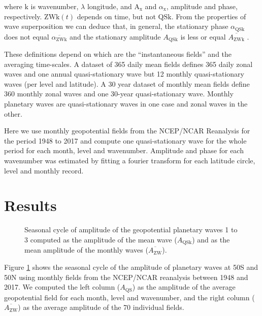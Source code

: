 \documentclass[draft,linenumbers]{agujournal2018}
\begin{document}
where \(\mathrm{k}\) is wavenumber, \(\lambda\) longitude, and
\(\mathrm{A_{x}}\) and \(\alpha_\mathrm{x}\), amplitude and phase,
respectively. \(\mathrm{ZWk}(t)\) depends on time, but not
\(\mathrm{QSk}\). From the properties of wave superposition we can
deduce that, in general, the stationary phase \(\alpha_\mathrm{QSk}\)
does not equal \(\overline{\alpha_\mathrm{ZWk}}\) and the stationary
amplitude \(A_\mathrm{QSk}\) is less or equal
\(\overline{A_\mathrm{ZWk}}\) \citep{Pain2005}.

These definitions depend on which are the ``instantaneous fields'' and
the averaging time-scales. A dataset of 365 daily mean fields defines
365 daily zonal waves and one annual quasi-stationary wave but 12
monthly quasi-stationary waves (per level and latitude). A 30 year
dataset of monthly mean fields define 360 monthly zonal waves and one
30-year quasi-stationary wave. Monthly planetary waves are
quasi-stationary waves in one case and zonal waves in the other.

Here we use monthly geopotential fields from the NCEP/NCAR Reanalysis
\citep{Kalnay1996} for the period 1948 to 2017 and compute one
quasi-stationary wave for the whole period for each month, level and
wavenumber. Amplitude and phase for each wavenumber was estimated by
fitting a fourier transform for each latitude circle, level and monthly
record.

\section{Results}

\begin{figure}[h]

{\centering {}\newline{}

}

\caption{Seasonal cycle of amplitude of the geopotential planetary waves 1 to 3 computed as the amplitude of the mean wave ($A_\mathrm{QSk}$) and as the mean amplitude of the monthly waves ($\overline{A_\mathrm{ZW} }$).}\label{fig:rao}
\end{figure}

Figure \ref{fig:rao} shows the seasonal cycle of the amplitude of
planetary waves at 50\degree S and 50\degree N using monthly fields from
the NCEP/NCAR reanalysis \citep{Kalnay1996} between 1948 and 2017. We
computed the left column (\(A_\mathrm{QS}\)) as the amplitude of the
average geopotential field for each month, level and wavenumber, and the
right column (\(\overline{A_\mathrm{ZW}}\)) as the average amplitude of
the 70 individual fields.
\end{document}

